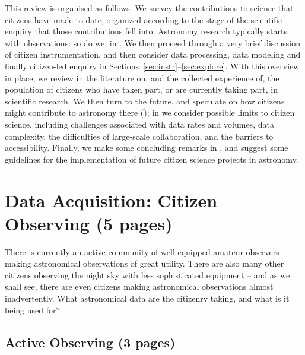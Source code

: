 \documentclass{ar2e}
\begin{document}
This review is organised as follows. We survey the contributions to science that
citizens have made to date, organized according to the stage of the scientific
enquiry that those contributions fell into. Astronomy research typically starts
with observations: so do we, in . We then proceed through a very
brief discussion of citizen instrumentation, and then consider  data processing,
data modeling and finally citizen-led enquiry in 
Sections~\ref{sec:instr}--\ref{sec:explore}. With this overview in place, we
review in  the literature on, and the collected experience of,
the population of citizens who have taken part, or are currently taking part, in
scientific research. We then turn to the future, and speculate on how citizens
might contribute to astronomy there (); in  
we consider possible limits to citizen science, including challenges associated
with data rates and volumes, data complexity, the difficulties of large-scale
collaboration, and the barriers to accessibility. Finally, we make some
concluding remarks in , and suggest some guidelines for
the implementation of future citizen science projects in astronomy.



\section{Data Acquisition: Citizen Observing (5 pages)}
\label{sec:obs}

There is currently an active community of well-equipped amateur observers making
astronomical observations of great utility. There are also many other citizens
observing the night sky with less sophisticated equipment -- and as we shall
see, there are even citizens making  astronomical observations almost
inadvertently. What astronomical data are the citizenry taking, and what is it
being used for?


\subsection{Active Observing (3 pages)}
\label{sec:obs:active}

\end{document}
